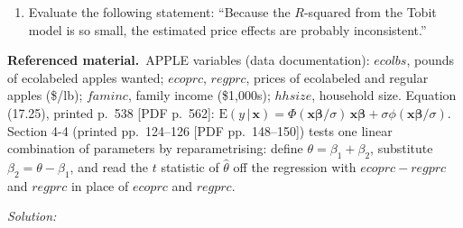 \documentclass[11pt,a4paper]{article}
\newif\ifsolucoes
\newcommand{\espacoresol}{2.5cm}   %
\numberwithin{equation}{questao}
\newcommand{\refmat}{\par\smallskip\noindent\textbf{Referenced material.}~}
\newenvironment{enunciado}{\par\begingroup\small}{\endgroup\par}
\newenvironment{itens}{\begin{enumerate}[label=(\roman*),leftmargin=2.4em,topsep=1pt,itemsep=1pt]}{\end{enumerate}}
\newcommand{\resolespaco}{\ifsolucoes\else\par\textit{Solution:}\vspace{\espacoresol}\par\fi}
\newcommand{\var}[1]{\mathit{#1}}
\newcommand{\E}{\mathrm{E}}
\begin{document}
\begin{enunciado}
\begin{itens}
\item Evaluate the following statement: ``Because the $R$-squared from the Tobit model is so small, the estimated price effects are probably inconsistent.''
\end{itens}
\refmat APPLE variables (data documentation): $\var{ecolbs}$, pounds of ecolabeled apples wanted;
$\var{ecoprc}$, $\var{regprc}$, prices of ecolabeled and regular apples (\$/lb); $\var{faminc}$, family income
(\$1{,}000s); $\var{hhsize}$, household size. Equation (17.25), printed p.~538 [PDF p.~562]:
$\E(y\,|\,\mathbf{x})=\Phi(\mathbf{x}\boldsymbol\beta/\sigma)\,\mathbf{x}\boldsymbol\beta+\sigma\phi(\mathbf{x}\boldsymbol\beta/\sigma)$.
Section 4-4 (printed pp.~124--126 [PDF pp.~148--150]) tests one linear combination of parameters by
reparametrising: define $\theta=\beta_1+\beta_2$, substitute $\beta_2=\theta-\beta_1$, and read the $t$ statistic
of $\hat\theta$ off the regression with $\var{ecoprc}-\var{regprc}$ and $\var{regprc}$ in place of $\var{ecoprc}$ and $\var{regprc}$.
\end{enunciado}
\resolespaco
\end{document}
